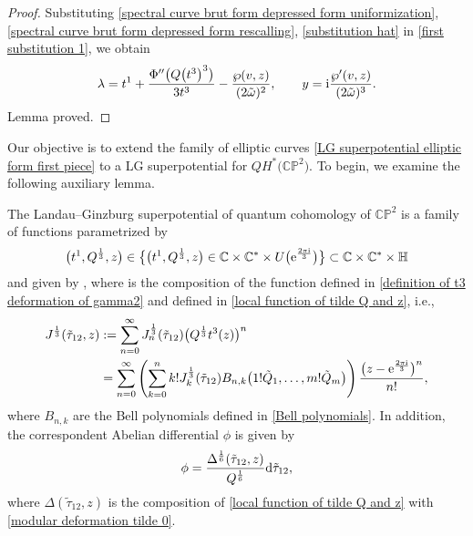 \begin{proof}
Substituting \eqref{spectral curve brut form depressed form uniformization}, \eqref{spectral curve brut form depressed form rescalling}, \eqref{substitution hat} in \eqref{first substitution 1}, we obtain
\begin{gather*}
\lambda=t^1+\frac{\Phi^{\prime\prime}\bigl(Q\bigl(t^3\bigr)^3\bigr)}{3t^3}-\frac{\wp(v,z)}{(2\tilde\omega)^2},\qquad
y={\rm i}\frac{\wp^{\prime}(v,z)}{(2\tilde\omega)^3}.
\end{gather*}
Lemma proved.
\end{proof}

Our objective is to extend the family of elliptic curves \eqref{LG superpotential elliptic form first piece} to a LG superpotential for $QH^{*}\bigl(\mathbb{CP}^2\bigr)$. To begin, we examine the following auxiliary lemma.

\begin{Lemma}
The Landau--Ginzburg superpotential of quantum cohomology of $\mathbb{CP}^2$ is a family of functions
parametrized by
\begin{gather*}
\bigl(t^1,Q^{\frac{1}{3}},z\bigr)\in 	\bigl\{ \bigl(t^1,Q^{\frac{1}{3}},z\bigr) \in \mathbb{C}\times\mathbb{C}^{*}\times U\bigl({\rm e}^{\frac{2\pi {\rm i}}{3}}\bigr) \bigr\}\subset \mathbb{C}\times\mathbb{C}^{*}\times\mathbb{H}
\end{gather*}
and given by
,
where  is the composition of the function  defined in \eqref{definition of t3 deformation of gamma2} and  defined in \eqref{local function of tilde Q and z}, i.e.,
\begin{align*}
J^{\frac{1}{3}}(\tilde\tau_{12}, z)&:=\sum_{n=0}^{\infty}J_n^{\frac{1}{3}}(\tilde\tau_{12})\bigl( Q^{\frac{1}{3}}t^3(z)\bigr)^n\\
&=\sum_{n=0}^{\infty}\left( \sum_{k=0}^{n} k! J_k^{\frac{1}{3}}(\tilde\tau_{12}) B_{n,k}\bigl(1!\tilde Q_1,\dots,m!\tilde Q_m\bigr) \right)\frac{\bigl(z-{\rm e}^{\frac{2\pi {\rm i}}{3}} \bigr)^n}{n!},
\end{align*}
where $B_{n,k}$ are the Bell polynomials defined in \eqref{Bell polynomials}.
 In addition, the correspondent Abelian differential $\phi$ is given by
\begin{gather*}
\phi=\frac{\Delta^{\frac{1}{6}}(\tilde\tau_{12},z)}{Q^{\frac{1}{6}}} {\rm d}\tilde\tau_{12},
\end{gather*}
where $\Delta(\tilde\tau_{12},z)$ is the composition of \eqref{local function of tilde Q and z} with \eqref{modular deformation tilde 0}.
\end{Lemma}


